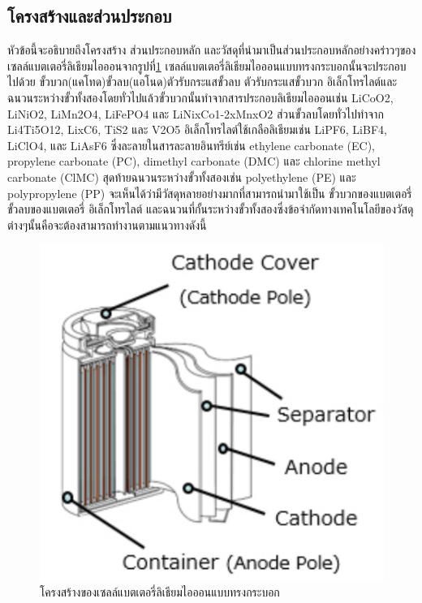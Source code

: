 \subsection{โครงสร้างและส่วนประกอบ}
หัวข้อนี้จะอธิบายถึงโครงสร้าง ส่วนประกอบหลัก และวัสดุที่นำมาเป็นส่วนประกอบหลักอย่างคร่าวๆของเซลล์แบตเตอรี่ลิเธียมไอออนจากรูปที่\ref{fig:Li-ion Structure} เซลล์แบตเตอรี่ลิเธียมไอออนแบบทรงกระบอกนั้นจะประกอบไปด้วย ขั้วบวก(แคโทด)ขั้วลบ(แอโนด)ตัวรับกระแสขั้วลบ ตัวรับกระแสขั้วบวก อิเล็กโทรไลต์และฉนวนระหว่างขั้วทั้งสองโดยทั่วไปแล้วขั้วบวกนั้นทำจากสารประกอบลิเธียมไอออนเช่น LiCoO2, LiNiO2, LiMn2O4, LiFePO4 และ LiNixCo1-2xMnxO2 ส่วนขั้วลบโดยทั่วไปทำจาก Li4Ti5O12, LixC6, TiS2 และ V2O5 อิเล็กโทรไลต์ใช้เกลือลิเธียมเช่น LiPF6, LiBF4, LiClO4, และ LiAsF6 ซึ่งละลายในสารละลายอินทรีย์เช่น ethylene carbonate (EC), propylene carbonate (PC), dimethyl carbonate (DMC) และ chlorine methyl carbonate (ClMC) สุดท้ายฉนวนระหว่างขั้วทั้งสองเช่น polyethylene (PE) และ polypropylene (PP) จะเห็นได้ว่ามีวัสดุหลายอย่างมากที่สามารถนำมาใช้เป็น ขั้วบวกของแบตเตอรี่ ขั้วลบของแบตเตอรี่ อิเล็กโทรไลต์ และฉนวนที่กั้นระหว่างขั้วทั้งสองซึ่งข้อจำกัดทางเทคโนโลยีของวัสดุต่างๆนั้นคือจะต้องสามารถทำงานตามแนวทางดังนี้
\begin{center}
	\begin{figure}[!h]
		\includegraphics[width=0.4\linewidth]{Chapters/img/Cyrinder_battery.pdf}
		\centering
		\captionsetup{justification=centering,margin=2cm}
		\caption{โครงสร้างของเซลล์แบตเตอรี่ลิเธียมไอออนแบบทรงกระบอก}
		\label{fig:Li-ion Structure}
	\end{figure}
\end{center}
